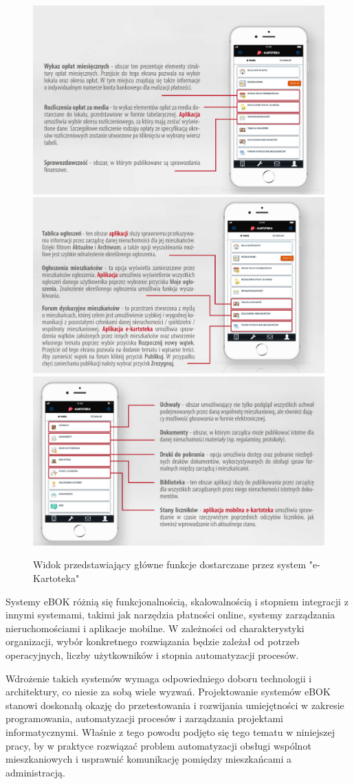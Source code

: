 \begin{figure}[htb]
    \centering
    \includegraphics[width=0.6\linewidth]{zrzuty_ekranu/kartoteka_manual_1.png} \\[-1ex]
    \includegraphics[width=0.6\linewidth]{zrzuty_ekranu/kartoteka_manual_2.png} \\[-1ex]
    \includegraphics[width=0.6\linewidth]{zrzuty_ekranu/kartoteka_manual_3.png}
    \caption{Widok przedstawiający główne funkcje dostarczane przez system "e-Kartoteka" ~\cite{e-kartoteka_manual}}
    \label{fig:kartoteka_manual}
\end{figure}



Systemy eBOK różnią się funkcjonalnością, skalowalnością i stopniem integracji z innymi systemami, takimi jak narzędzia płatności online, systemy zarządzania nieruchomościami i aplikacje mobilne. W zależności od charakterystyki organizacji, wybór konkretnego rozwiązania będzie zależał od potrzeb operacyjnych, liczby użytkowników i stopnia automatyzacji procesów.

Wdrożenie takich systemów wymaga odpowiedniego doboru technologii i architektury, co niesie za sobą wiele wyzwań. Projektowanie systemów eBOK stanowi doskonałą okazję do przetestowania i rozwijania umiejętności w zakresie programowania, automatyzacji procesów i zarządzania projektami informatycznymi. Właśnie z tego powodu podjęto się tego tematu w niniejszej pracy, by w praktyce rozwiązać problem automatyzacji obsługi wspólnot mieszkaniowych i usprawnić komunikację pomiędzy mieszkańcami a administracją.

